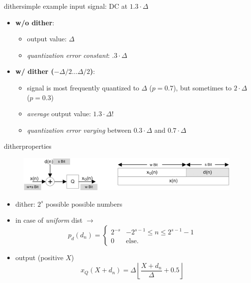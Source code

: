	\begin{frame}{dither}{simple example}
		input signal: DC at $1.3\cdot\Delta$
        \bigskip
		\begin{itemize}
			\item	\textbf{w/o dither}: 
				\begin{itemize}
					\item	output value: $\Delta$
					\item	\textit{quantization error constant}: $.3\cdot\Delta$
				\end{itemize}
			\pause
            \bigskip
			\item	\textbf{w/ dither ($-\Delta/2\ldots\Delta/2$)}: 
				\begin{itemize}
					\item	signal is most frequently quantized to $\Delta$ ($p = 0.7$), but sometimes to $2\cdot\Delta$ ($p=0.3$)
					\bigskip
                    \item<3->	\textit{average} output value: $1.3\cdot\Delta$!
                    \item<3->   \textit{quantization error varying} between $0.3\cdot\Delta$ and $0.7\cdot\Delta$
				\end{itemize}
		\end{itemize}
	\end{frame}	
	\begin{frame}{dither}{properties}
		\begin{figure}
			\centering
				\includegraphics[scale=0.9]{Graph/quantisierung_mit_dither.png}
		\end{figure}
        \pause
        \begin{itemize}
            \item   dither: $2^s$ possible possible numbers
            \pause
            \item   in case of \textit{uniform} dist  $\rightarrow$
            \begin{equation*}
                 p_d(d_n) = \left\lbrace \begin{array}{ll}
                    2^{-s} & -2^{s-1}\leq n \leq 2^{s-1}-1\\
                    0 & \text{else}.
                \end{array}\right.
            \end{equation*}
            \pause
            \item   output (positive $X$)
            \begin{equation*}
                x_Q(X + d_n) = \Delta\left\lfloor \frac{X + d_n}{\Delta} + 0.5 \right\rfloor
            \end{equation*}
        \end{itemize}
	\end{frame}	

